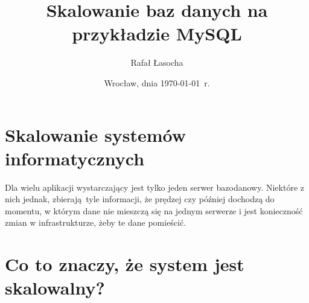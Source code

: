 \documentclass[a4paper,12pt]{article}
\title{{\textbf{Skalowanie baz danych na przykładzie MySQL}}}
\author{Rafał Łasocha}
\date{Wrocław, dnia \today\ r.}
\begin{document}
\maketitle

\section{Skalowanie systemów informatycznych}

Dla wielu aplikacji wystarczający jest tylko jeden serwer bazodanowy. Niektóre z nich jednak, zbierają tyle informacji, że prędzej czy później dochodzą do momentu, w którym dane nie mieszczą się na jednym serwerze i jest konieczność zmian w infrastrukturze, żeby te dane pomieścić.

\section{Co to znaczy, że system jest skalowalny?}
\end{document}
